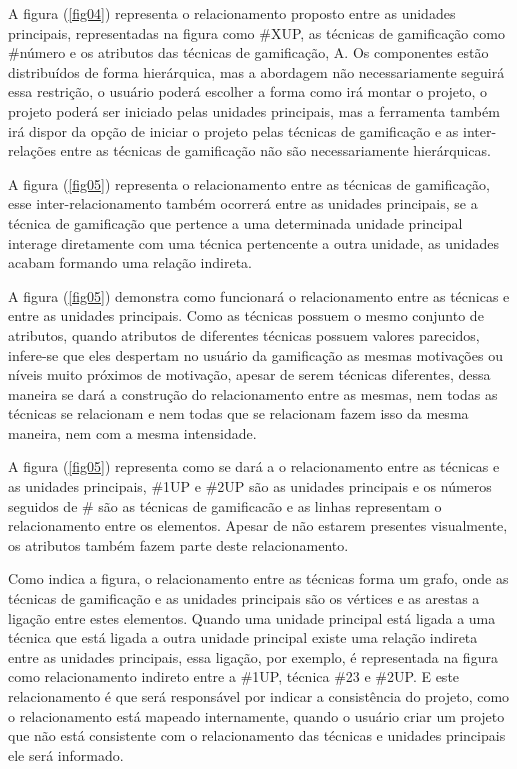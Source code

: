 A figura (\ref{fig04}) representa o relacionamento proposto entre as unidades principais, representadas na figura como \#XUP, as técnicas de gamificação como \#número e os atributos das técnicas de gamificação, A. Os componentes estão distribuídos de forma hierárquica, mas a abordagem não necessariamente seguirá essa restrição, o usuário poderá escolher a forma como irá montar o projeto, o projeto poderá ser iniciado pelas unidades principais, mas a ferramenta também irá dispor da opção de iniciar o projeto pelas técnicas de gamificação e as inter-relações entre as técnicas de gamificação não são necessariamente hierárquicas.

A figura (\ref{fig05}) representa o relacionamento entre as técnicas de gamificação, esse inter-relacionamento também ocorrerá entre as unidades principais, se a técnica de gamificação que pertence a uma determinada unidade principal interage diretamente com uma técnica pertencente a outra unidade, as unidades acabam formando uma relação indireta. 

A figura (\ref{fig05}) demonstra como funcionará o relacionamento entre as técnicas e entre as unidades principais. Como as técnicas possuem o mesmo conjunto de atributos, quando atributos de diferentes técnicas possuem valores parecidos, infere-se que eles despertam no usuário da gamificação as mesmas motivações ou níveis muito próximos de motivação, apesar de serem técnicas diferentes, dessa maneira se dará a construção do relacionamento entre as mesmas, nem todas as técnicas se relacionam e nem todas que se relacionam fazem isso da mesma maneira, nem com a mesma intensidade.

A figura (\ref{fig05}) representa como se dará a o relacionamento entre as técnicas e as unidades principais, \#1UP e \#2UP são as unidades principais e os números seguidos de \# são as técnicas de gamificacão e as linhas representam o relacionamento entre os elementos. Apesar de não estarem presentes visualmente, os atributos também fazem parte deste relacionamento.

Como indica a figura, o relacionamento entre as técnicas forma um grafo, onde as técnicas de gamificação e as unidades principais são os vértices e as arestas a ligação entre estes elementos. Quando uma unidade principal está ligada a uma técnica que está ligada a outra unidade principal existe uma relação indireta entre as unidades principais, essa ligação, por exemplo, é representada na figura como relacionamento indireto entre a \#1UP, técnica \#23 e \#2UP. E este relacionamento é que será responsável por indicar a consistência do projeto, como o relacionamento está mapeado internamente, quando o usuário criar um projeto que não está consistente com o relacionamento das técnicas e unidades principais ele será informado.


